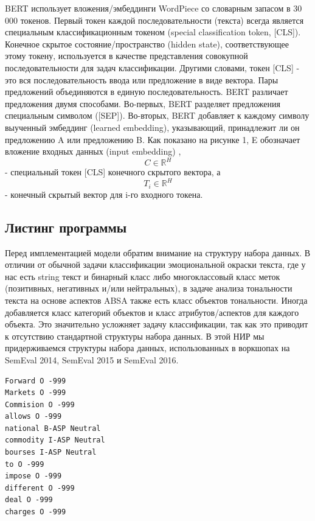 BERT использует вложения/эмбеддинги WordPiece со словарным запасом в 30 000 токенов. Первый токен каждой последовательности (текста) всегда является специальным классификационным токеном (special classification token, [CLS]). Конечное скрытое состояние/пространство (hidden state), соответствующее этому токену, используется в качестве представления совокупной последовательности для задач классификации. Другими словами, токен [CLS]  - это вся последовательность ввода или предложение в виде вектора. Пары предложений объединяются в единую последовательность. BERT различает предложения двумя способами. Во-первых, BERT разделяет предложения специальным символом ([SEP]). Во-вторых, BERT добавляет к каждому символу выученный эмбеддинг (learned embedding), указывающий, принадлежит ли он предложению A или предложению B. Как показано на рисунке 1, E обозначает вложение входных данных (input embedding) , \[C \in 	\mathbb{R}^H\] - специальный токен [CLS] конечного скрытого вектора, а \[T_i \in 	\mathbb{R}^H\] - конечный скрытый вектор для i-го входного токена.

\subsection{Листинг программы}

Перед имплементацией модели обратим внимание на структуру набора данных. В отличии от обычной задачи классификации эмоциональной окраски текста, где у нас есть string текст и бинарный класс либо многоклассовый класс меток (позитивных, негативных и/или нейтральных), в задаче анализа тональности текста на основе аспектов ABSA также есть класс объектов тональности. Иногда добавляется класс категорий объектов и класс атрибутов/аспектов для каждого объекта. Это значительно усложняет задачу классификации, так как 
это приводит к отсутствию стандартной структуры набора данных. В этой НИР мы придерживаемся структуры набора данных, использованных в воркшопах на SemEval 2014, SemEval 2015 и SemEval 2016. 

\begin{lstlisting}[label=listing1, caption=Структура набора данны]
Forward O -999
Markets O -999
Commision O -999
allows O -999
national B-ASP Neutral
commodity I-ASP Neutral
bourses I-ASP Neutral
to O -999
impose O -999
different O -999
deal O -999
charges O -999
\end{lstlisting}

